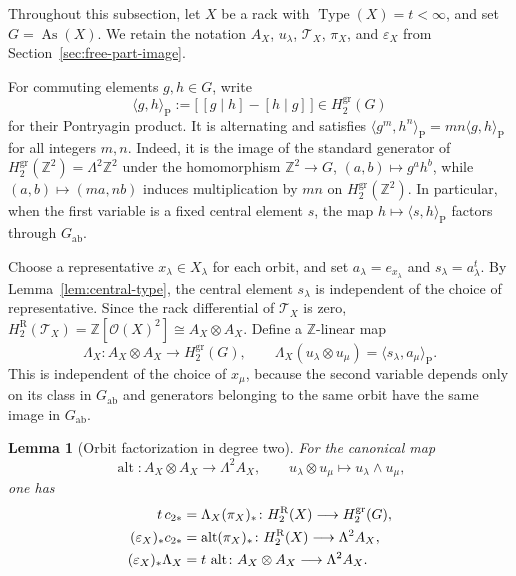 \documentclass[11pt]{article}
\newtheorem{lemma}[theorem]{Lemma}
\DeclareMathOperator{\As}{As}
\DeclareMathOperator{\Type}{Type}
\newcommand{\ZZ}{\mathbb Z}
\newcommand{\OO}{\mathcal O}
\newcommand{\gr}{\mathrm{gr}}
\newcommand{\R}{\mathrm R}
\newcommand{\ab}{\mathrm{ab}}
\begin{document}
Throughout this subsection, let $X$ be a rack with
$\Type(X)=t<\infty$, and set $G=\As(X)$. We retain the notation
$A_X$, $u_\lambda$, $\mathcal T_X$, $\pi_X$, and $\varepsilon_X$ from
Section~\ref{sec:free-part-image}.

For commuting elements $g,h\in G$, write
\begin{equation}
 \langle g,h\rangle_{\mathrm P}
 :=\bigl[\,[g\mid h]-[h\mid g] \,\bigr]
 \in H_2^{\gr}(G)
 \label{eq:Pontryagin-class}
\end{equation}
for their Pontryagin product. It is alternating and satisfies
$\langle g^m,h^n\rangle_{\mathrm P}=mn\langle g,h\rangle_{\mathrm P}$ for
all integers $m,n$. Indeed, it is the image of the standard generator of
$H_2^{\gr}(\ZZ^2)=\Lambda^2\ZZ^2$ under the homomorphism
$\ZZ^2\to G$, $(a,b)\mapsto g^ah^b$, while
$(a,b)\mapsto(ma,nb)$ induces multiplication by $mn$ on
$H_2^{\gr}(\ZZ^2)$. In particular, when the first variable is a fixed central
element $s$, the map $h\mapsto\langle s,h\rangle_{\mathrm P}$ factors through
$G_{\ab}$.

Choose a representative $x_\lambda\in X_\lambda$ for each orbit, and set
$a_\lambda=e_{x_\lambda}$ and $s_\lambda=a_\lambda^t$. By
Lemma~\ref{lem:central-type}, the central element $s_\lambda$ is independent
of the choice of representative. Since the rack differential of
$\mathcal T_X$ is zero,
$H_2^\R(\mathcal T_X)=\ZZ[\OO(X)^2]\cong A_X\otimes A_X$. Define a
$\ZZ$-linear map
\[
\Lambda_X\colon A_X\otimes A_X\longrightarrow H_2^{\gr}(G),
 \qquad
 \Lambda_X(u_\lambda\otimes u_\mu)
 =\langle s_\lambda,a_\mu\rangle_{\mathrm P}.
\]
This is independent of the choice of $x_\mu$, because the second variable
depends only on its class in $G_{\ab}$ and generators belonging to the same
orbit have the same image in $G_{\ab}$.

\begin{lemma}[Orbit factorization in degree two]
\label{lem:degree-two-orbit-factorization}
For the canonical map
\[
 \operatorname{alt}\colon A_X\otimes A_X\longrightarrow\Lambda^2A_X,
 \qquad u_\lambda\otimes u_\mu\longmapsto u_\lambda\wedge u_\mu,
\]
one has
\begin{align}
 t\,c_{2*}&=\Lambda_X(\pi_X)_*
 \colon H_2^\R(X)\longrightarrow H_2^{\gr}(G),\notag\\
 (\varepsilon_X)_*c_{2*}&=\operatorname{alt}(\pi_X)_*
 \colon H_2^\R(X)\longrightarrow\Lambda^2A_X,
 \label{eq:epsilon-c2-alt}\\
 (\varepsilon_X)_*\Lambda_X&=t\,\operatorname{alt}
 \colon A_X\otimes A_X\longrightarrow\Lambda^2A_X.
 \label{eq:epsilon-Lambda-alt}
\end{align}
\end{lemma}
\end{document}
